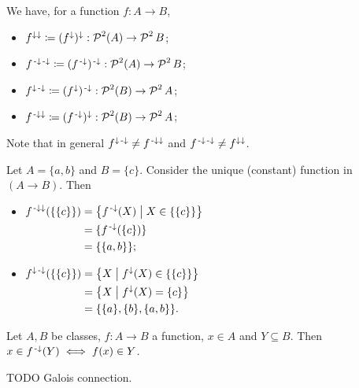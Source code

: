 We have, for a function $f:A\to B$,
\begin{itemize}
\item $f^{\downarrow\downarrow}\coloneqq (f^{\downarrow})^\downarrow: \operatorname{\mathcal{P}}^2(A) \to \operatorname{\mathcal{P}}^2{B}$;
\item $f^{{\text{\hspace{0.15em}-}\downarrow}{\text{\hspace{0.15em}-}\downarrow}}\coloneqq (f^{{\text{\hspace{0.15em}-}\downarrow}})^{\text{\hspace{0.15em}-}\downarrow}: \operatorname{\mathcal{P}}^2(A) \to \operatorname{\mathcal{P}}^2{B}$;
\item $f^{\downarrow{\text{\hspace{0.15em}-}\downarrow}}\coloneqq (f^{\downarrow})^{\text{\hspace{0.15em}-}\downarrow}: \operatorname{\mathcal{P}}^2(B) \to \operatorname{\mathcal{P}}^2{A}$;
\item $f^{{\text{\hspace{0.15em}-}\downarrow}\downarrow}\coloneqq (f^{{\text{\hspace{0.15em}-}\downarrow}})^\downarrow: \operatorname{\mathcal{P}}^2(B) \to \operatorname{\mathcal{P}}^2{A}$;
\end{itemize}

Note that in general $f^{\downarrow{\text{\hspace{0.15em}-}\downarrow}} \neq f^{{\text{\hspace{0.15em}-}\downarrow}\downarrow}$ and $f^{{\text{\hspace{0.15em}-}\downarrow}{\text{\hspace{0.15em}-}\downarrow}} \neq f^{\downarrow\downarrow}$.

\begin{example}
Let $A = \{a,b\}$ and $B = \{c\}$. Consider the unique (constant) function in $(A\to B)$. Then
\begin{itemize}
\item $\begin{aligned}[t]
f^{\preimf\imf}(\{\{c\}\}) &= \setbuilder{f^\preimf(X)}{X\in \{\{c\}\}} \\
&= \{f^\preimf(\{c\})\} \\
&= \{\{a,b\}\};
\end{aligned}$
\item $\begin{aligned}[t]
f^{\imf\preimf}(\{\{c\}\}) &= \setbuilder{X}{f^\imf(X)\in \{\{c\}\}} \\
&= \setbuilder{X}{f^\imf(X) = \{c\}} \\
&= \{ \{a\}, \{b\}, \{a,b\} \}.
\end{aligned}$
\end{itemize}
\end{example}

\begin{lemma}
Let $A,B$ be classes, $f:A\to B$ a function, $x\in A$ and $Y\subseteq B$. Then $x\in f^{\text{\hspace{0.15em}-}\downarrow}(Y) \iff f(x)\in Y$.
\end{lemma}
TODO Galois connection.

